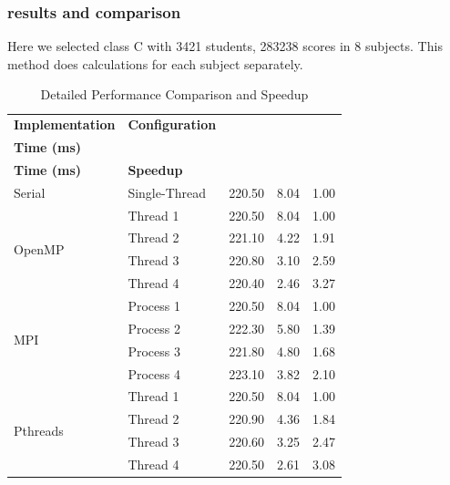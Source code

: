 \documentclass[12pt,a4paper]{article}
\begin{document}
\subsubsection{results and comparison}
Here we selected class C with 3421 students, 283238 scores in 8 subjects. This method does calculations for each subject separately.

\begin{table}[H]
\centering
\small
\setlength{\tabcolsep}{6pt}
\renewcommand{\arraystretch}{1.3}
\caption{Detailed Performance Comparison and Speedup}
\label{tab:class_performance_speedup}
\begin{tabular}{|l|l|c|c|c|}
\hline
\textbf{Implementation} & \textbf{Configuration} & \makecell[c]{\textbf{DB Fetch}\\\textbf{Time (ms)}} & \makecell[c]{\textbf{Calculation}\\\textbf{Time (ms)}} & \textbf{Speedup} \\ \hline
Serial & Single-Thread & 220.50 & 8.04 & 1.00 \\ \hline
\multirow{4}{*}{OpenMP} & Thread 1 & 220.50 & 8.04 & 1.00 \\ \cline{2-5}
 & Thread 2 & 221.10 & 4.22 & 1.91 \\ \cline{2-5}
 & Thread 3 & 220.80 & 3.10 & 2.59 \\ \cline{2-5}
 & Thread 4 & 220.40 & 2.46 & 3.27 \\ \hline
\multirow{4}{*}{MPI} & Process 1 & 220.50 & 8.04 & 1.00 \\ \cline{2-5}
 & Process 2 & 222.30 & 5.80 & 1.39 \\ \cline{2-5}
 & Process 3 & 221.80 & 4.80 & 1.68 \\ \cline{2-5}
 & Process 4 & 223.10 & 3.82 & 2.10 \\ \hline
\multirow{4}{*}{Pthreads} & Thread 1 & 220.50 & 8.04 & 1.00 \\ \cline{2-5}
 & Thread 2 & 220.90 & 4.36 & 1.84 \\ \cline{2-5}
 & Thread 3 & 220.60 & 3.25 & 2.47 \\ \cline{2-5}
 & Thread 4 & 220.50 & 2.61 & 3.08 \\ \hline
\end{tabular}
\end{table}
\end{document}
